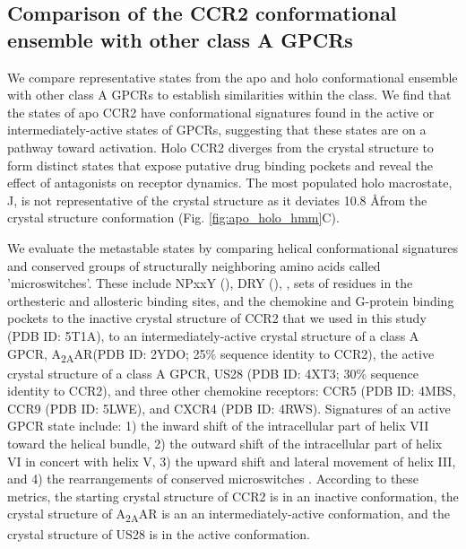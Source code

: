 \subsection{Comparison of the CCR2 conformational ensemble with other class A GPCRs}

We compare representative states from the apo and holo conformational ensemble with other class A GPCRs to establish similarities within the class.
We find that the states of apo CCR2 have conformational signatures found in the active or intermediately-active states of GPCRs, suggesting that these states are on a pathway toward activation.
Holo CCR2 diverges from the crystal structure to form distinct states that expose putative drug binding pockets and reveal the effect of antagonists on receptor dynamics. The most populated holo macrostate, J, is not representative of the crystal structure as it deviates 10.8 \AA from the crystal structure conformation (Fig. \ref{fig:apo_holo_hmm}C).

We evaluate the metastable states by comparing helical conformational signatures and conserved groups of structurally neighboring amino acids called 'microswitches'.
These include NPxxY (), DRY (), , sets of residues in the orthesteric and allosteric binding sites, and the chemokine and G-protein binding pockets to the inactive crystal structure of CCR2 that we used in this study (PDB ID: 5T1A), to an intermediately-active crystal structure of a class A GPCR, A\textsubscript{2A}AR(PDB ID: 2YDO\cite{Lebon2011}; 25\% sequence identity to CCR2), the active crystal structure of a class A GPCR, US28 (PDB ID: 4XT3\cite{Burg2015}; 30\% sequence identity to CCR2), and three other chemokine receptors: CCR5 (PDB ID: 4MBS\cite{Tan2013}, CCR9 (PDB ID: 5LWE\cite{Oswald2016}), and CXCR4 (PDB ID: 4RWS\cite{Qin2015}).
Signatures of an active GPCR state include:
1) the inward shift of the intracellular part of helix VII toward the helical bundle,
2) the outward shift of the intracellular part of helix VI in concert with helix V,
3) the upward shift and lateral movement of helix III,
and 4) the rearrangements of conserved microswitches \cite{Katritch2013}.
According to these metrics, the starting crystal structure of CCR2 is in an inactive conformation\cite{Zheng2016}, the crystal structure of A\textsubscript{2A}AR is an an intermediately-active conformation, and the crystal structure of US28 is in the active conformation.

